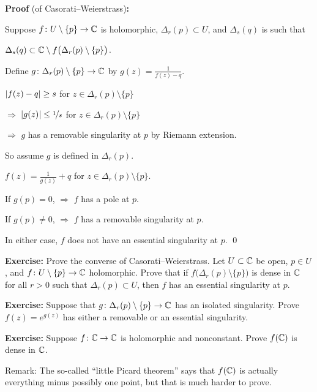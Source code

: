 \documentclass[10pt,aspectratio=169]{beamer}
\begin{document}
\begin{frame}

\textbf{Proof} (of Casorati--Weierstrass)\textbf{:}

Suppose $f \colon U \setminus \{ p \} \to {\mathbb{C}}$ is holomorphic,
$\Delta_r(p) \subset U$, and $\Delta_s(q)$ is such that

\medskip

$\Delta_s(q) \subset {\mathbb{C}} \setminus f\bigl(\Delta_r(p) \setminus \{ p \} \bigr)$.

\medskip
\pause

Define $g \colon \Delta_r(p) \setminus \{p\} \to {\mathbb{C}}$ \quad
by \quad $\displaystyle
g(z) = \frac{1}{f(z) - q}$.

\medskip
\pause

$\lvert {f(z)-q} \rvert \geq s$ for $z \in \Delta_r(p) \setminus \{p\}$

\medskip
\pause

$\Rightarrow$ \quad
$\lvert {g(z)} \rvert \leq \nicefrac{1}{s}$ for $z \in \Delta_r(p) \setminus \{p\}$

\medskip
\pause
$\Rightarrow$ \quad
$g$ has a removable singularity at $p$ by Riemann extension.

\medskip
\pause

So assume $g$ is defined in $\Delta_r(p)$.

\medskip
\pause

$\displaystyle
f(z) = \frac{1}{g(z)} + q
$
\quad
for $z \in \Delta_r(p) \setminus \{ p \}$.

\medskip
\pause

If $g(p)=0$, \quad $\Rightarrow$ \quad $f$ has a pole at $p$.

\medskip
\pause

If $g(p) \not= 0$, \quad $\Rightarrow$ \quad $f$ has a removable singularity at $p$.

\medskip
\pause

In either case, $f$ does not have an essential singularity at $p$.
\qed

\end{frame}

\begin{frame}
\textbf{Exercise:}
Prove the converse of Casorati--Weierstrass.
Let $U \subset {\mathbb{C}}$ be open, $p \in U$, and
$f \colon U \setminus \{ p \} \to {\mathbb{C}}$
holomorphic.
Prove that if $f\bigl(\Delta_r(p) \setminus \{ p \} \bigr)$ is dense in ${\mathbb{C}}$
for all $r > 0$ such that $\Delta_r(p) \subset U$,
then $f$ has an essential singularity at $p$.

\medskip
\pause

\textbf{Exercise:}
Suppose that $g \colon \Delta_r(p) \setminus \{ p \} \to {\mathbb{C}}$
has an isolated singularity.  Prove $f(z) = e^{g(z)}$
has either a removable or an essential singularity.

\medskip
\pause

\textbf{Exercise:}
Suppose $f \colon {\mathbb{C}} \to {\mathbb{C}}$ is holomorphic and nonconstant.
Prove $f({\mathbb{C}})$ is dense in ${\mathbb{C}}$.
\pause

Remark: The so-called ``little Picard theorem'' says that $f({\mathbb{C}})$
is actually everything minus possibly one point,
but that is much harder to prove.
\end{frame}
\end{document}
